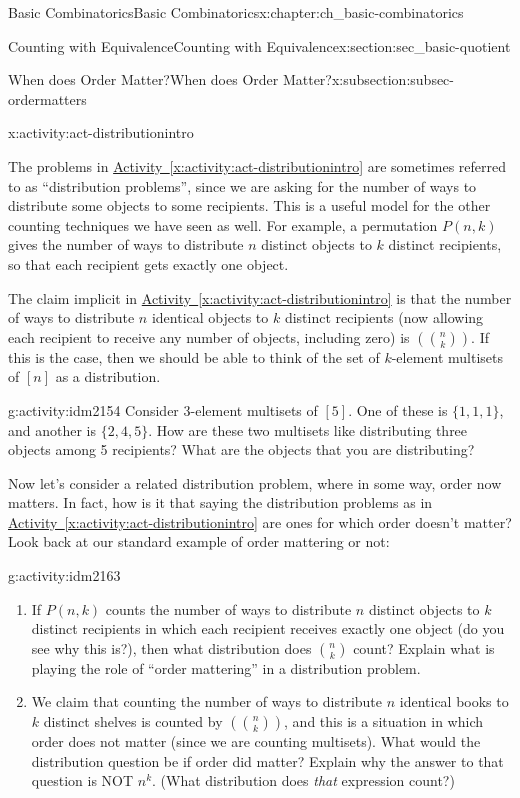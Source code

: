\documentclass[oneside,10pt,]{book}
\numberwithin{equation}{chapter}
\newcommand{\mchoose}[2]{\left(\!\binom{#1}{#2}\!\right)}
\begin{document}
\begin{chapterptx}{Basic Combinatorics}{}{Basic Combinatorics}{}{}{x:chapter:ch_basic-combinatorics}
\begin{sectionptx}{Counting with Equivalence}{}{Counting with Equivalence}{}{}{x:section:sec_basic-quotient}
\begin{subsectionptx}{When does Order Matter?}{}{When does Order Matter?}{}{}{x:subsection:subsec-ordermatters}
\begin{activity}{}{x:activity:act-distributionintro}
\begin{enumerate}[font=\bfseries,label=(\alph*),ref=\alph*]
\end{enumerate}
\end{activity}
The problems in \hyperref[x:activity:act-distributionintro]{Activity~\ref{x:activity:act-distributionintro}} are sometimes referred to as ``distribution problems'', since we are asking for the number of ways to distribute some objects to some recipients.   This is a useful model for the other counting techniques we have seen as well.  For example, a permutation \(P(n,k)\) gives the number of ways to distribute \(n\) distinct objects to \(k\) distinct recipients, so that each recipient gets exactly one object.%
\par
The claim implicit in \hyperref[x:activity:act-distributionintro]{Activity~\ref{x:activity:act-distributionintro}} is that the number of ways to distribute \(n\) identical objects to \(k\) distinct recipients (now allowing each recipient to receive any number of objects, including zero) is \(\mchoose{n}{k}\).  If this is the case, then we should be able to think of the set of \(k\)-element multisets of \([n]\) as a distribution.%
\begin{activity}{}{g:activity:idm2154}%
Consider \(3\)-element multisets of \([5]\).  One of these is \(\{1,1,1\}\), and another is \(\{2,4,5\}\).  How are these two multisets like distributing three objects among 5 recipients?  What are the objects that you are distributing?%
\end{activity}
Now let's consider a related distribution problem, where in some way, order now matters.  In fact, how is it that saying the distribution problems as in \hyperref[x:activity:act-distributionintro]{Activity~\ref{x:activity:act-distributionintro}} are ones for which order doesn't matter?  Look back at our standard example of order mattering or not:%
\begin{activity}{}{g:activity:idm2163}%
\begin{enumerate}[font=\bfseries,label=(\alph*),ref=\alph*]
\item{}If \(P(n,k)\) counts the number of ways to distribute \(n\) distinct objects to \(k\) distinct recipients in which each recipient receives exactly one object (do you see why this is?), then what distribution does \(\binom{n}{k}\) count?  Explain what is playing the role of ``order mattering'' in a distribution problem.%
\item{}We claim that counting the number of ways to distribute \(n\) identical books to \(k\) distinct shelves is counted by \(\mchoose{n}{k}\), and this is a situation in which order does not matter (since we are counting multisets).  What would the distribution question be if order did matter?  Explain why the answer to that question is NOT \(n^k\). (What distribution does \emph{that} expression count?)%

\end{enumerate}
\end{activity}
\end{subsectionptx}
\end{sectionptx}
\end{chapterptx}
\end{document}
